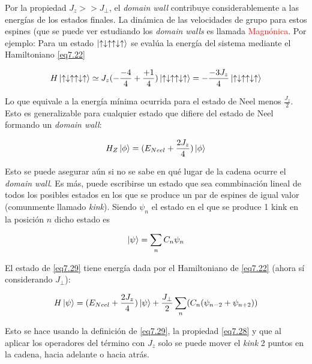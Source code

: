 \documentclass{book}
\begin{document}
Por la propiedad $J_z>>J_\perp$, el \textit{domain wall} contribuye considerablemente a las energías de los estados finales. La dinámica de las velocidades de grupo para estos espines (que se puede ver estudiando los \textit{domain walls} es llamada \textcolor{red}{Magnónica}. Por ejemplo: Para un estado $\ket{\uparrow\downarrow\uparrow\uparrow\downarrow\uparrow}$ se evalúa la energía del sistema mediante el Hamiltoniano \ref{eq7.22}

\begin{equation}\label{eq7.27}H\ket{\uparrow\downarrow\uparrow\uparrow\downarrow\uparrow}\simeq J_z(-\frac{-4}{4}+\frac{+1}{4})\ket{\uparrow\downarrow\uparrow\uparrow\downarrow\uparrow}=-\frac{-3J_z}{4}\ket{\uparrow\downarrow\uparrow\uparrow\downarrow\uparrow}\end{equation}

Lo que equivale a la energía mínima ocurrida para el estado de Neel menos $\frac{J_z}{2}$. Esto es generalizable para cualquier estado que difiere del estado de Neel formando un \textit{domain wall}:

\begin{equation}\label{eq7.28}H_Z\ket{\phi}=(E_{Neel}+\frac{2J_z}{4})\ket{\phi}\end{equation}

Esto se puede asegurar aún si no se sabe en qué lugar de la cadena ocurre el \textit{domain wall}.  Es más, puede escribirse un estado que sea commbinación lineal de todos los posibles estados en los que se produce un par de espines de igual valor (comunmente llamado \textit{kink}). Siendo $\psi_n$ el estado en el que se produce 1 kink en la posición $n$ dicho estado es 

\begin{equation}\label{eq7.29}\ket{\psi}=\sum_nC_n \psi_n\end{equation}

El estado de \ref{eq7.29} tiene energía dada por el Hamiltoniano de \ref{eq7.22} (ahora sí considerando $J_\perp$):

\begin{equation}\label{eq7.30}H\ket{\psi}=(E_{Neel}+\frac{2J_z}{4})\ket{\psi}+\frac{J_\perp}{2}\sum_n(C_n(\psi_{n-2}+\psi_{n+2}))\end{equation}

Esto se hace usando la definición de \ref{eq7.29}, la propiedad \ref{eq7.28} y que al aplicar los operadores del término con $J_z$ solo se puede mover el \textit{kink} 2 puntos en la cadena, hacia adelante o hacia atrás. 
\end{document}
